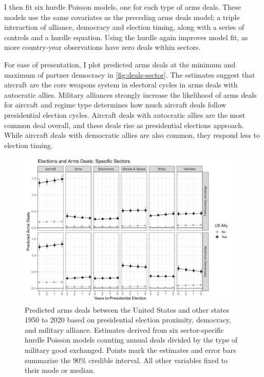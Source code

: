 \documentclass[12pt]{article}
\begin{document}
I then fit six hurdle Poisson models, one for each type of arms deals. 
These models use the same covariates as the preceding arms deals model; a triple interaction of alliance, democracy and election timing, along with a series of controls and a hurdle equation.
Using the hurdle again improves model fit, as more country-year observations have zero deals within sectors. 


For ease of presentation, I plot predicted arms deals at the minimum and maximum of partner democracy in \autoref{fig:deals-sector}.
The estimates suggest that aircraft are the core weapons system in electoral cycles in arms deals with autocratic allies. 
Military alliances strongly increase the likelihood of arms deals for aircraft and regime type determines how much aircraft deals follow presidential election cycles. 
Aircraft deals with autocratic allies are the most common deal overall, and these deals rise as presidential elections approach. 
While aircraft deals with democratic allies are also common, they respond less to election timing. 



\begin{figure}[htpb]
	\centering
		\includegraphics[width=0.95\textwidth]{../figures/deals-sector.png}
	\caption{Predicted arms deals between the United States and other states 1950 to 2020 based on presidential election proximity, democracy, and military alliance. Estimates derived from six sector-specific hurdle Poisson models counting annual deals divided by the type of military good exchanged. Points mark the estimates and error bars summarize the 90\% credible interval. All other variables fixed to their mode or median.}
	\label{fig:deals-sector}
\end{figure}
\end{document}
